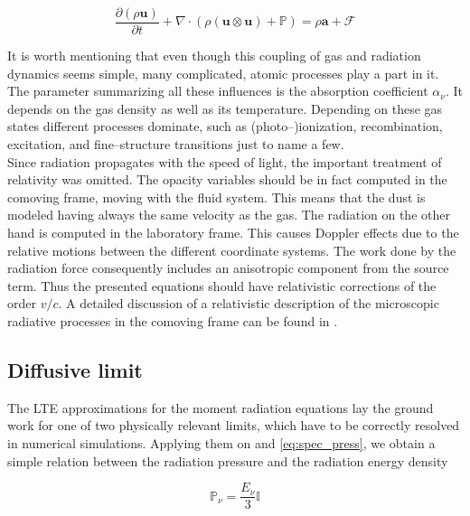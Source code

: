 \begin{equation}
  \frac{\partial (\rho\textbf{u})}{\partial t} + \nabla\cdot (\rho(\textbf{u} \otimes \textbf{u}) + \mathbb{P}) = \rho \textbf{a} + \mathcal{F}
\end{equation}

It is worth mentioning that even though this coupling of gas and radiation dynamics seems simple, many complicated, atomic processes play a part in it.
The parameter summarizing all these influences is the absorption coefficient $\alpha_{\nu}$.
It depends on the gas density as well as its temperature.
Depending on these gas states different processes dominate, such as (photo--)ionization, recombination, excitation, and fine--structure transitions just to name a few.
\\[6pt]
%
Since radiation propagates with the speed of light, the important treatment of relativity was omitted.
The opacity variables should be in fact computed in the comoving frame, moving with the fluid system.
This means that the dust is modeled having always the same velocity as the gas.
The radiation on the other hand is computed in the laboratory frame.
This causes Doppler effects due to the relative motions between the different coordinate systems.
The work done by the radiation force consequently includes an anisotropic component from the source term.
Thus the presented equations should have relativistic corrections of the order $v/c$.
A detailed discussion of a relativistic description of the microscopic radiative processes in the comoving frame can be found in \citet{Mihalas}.

\subsection{Diffusive limit}
\label{subsec:Diffusion_limit}

The LTE approximations for the moment radiation equations lay the ground work for one of two physically relevant limits, which have to be correctly resolved in numerical simulations.
Applying them on  and \eqref{eq:spec_press}, we obtain a simple relation between the radiation pressure and the radiation energy density

\begin{equation}
  \mathbb{P}_{\nu} = \frac{E_{\nu}}{3}\mathbb{I}
\label{eq:LTE_radiation_press}
\end{equation}

